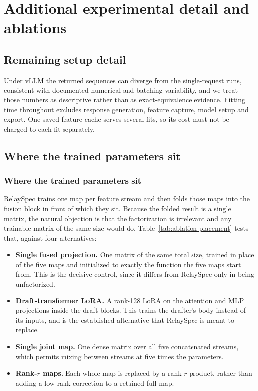 \section{Additional experimental detail and ablations}
\label{app:ablations}

\subsection{Remaining setup detail}
\label{app:setup-full}
Under vLLM the returned sequences can diverge from the single-request runs, consistent with documented numerical and batching variability, and we treat those numbers as descriptive rather than as exact-equivalence evidence. Fitting time throughout excludes response generation, feature capture, model setup and export. One saved feature cache serves several fits, so its cost must not be charged to each fit separately.

\subsection{Where the trained parameters sit}
\label{app:placement}

\subsubsection{Where the trained parameters sit}
\label{sec:ablation-placement}
RelaySpec trains one map per feature stream and then folds those maps into the fusion block in front of which they sit. Because the folded result is a single matrix, the natural objection is that the factorization is irrelevant and any trainable matrix of the same size would do. Table~\ref{tab:ablation-placement} tests that, against four alternatives:

\begin{itemize}\itemsep1pt\parskip0pt
\item \textbf{Single fused projection.} One matrix of the same total size, trained in place of the five maps and initialized to exactly the function the five maps start from. This is the decisive control, since it differs from RelaySpec only in being unfactorized.
\item \textbf{Draft-transformer LoRA.} A rank-128 LoRA on the attention and MLP projections inside the draft blocks. This trains the drafter's body instead of its inputs, and is the established alternative that RelaySpec is meant to replace.
\item \textbf{Single joint map.} One dense matrix over all five concatenated streams, which permits mixing between streams at five times the parameters.
\item \textbf{Rank-$r$ maps.} Each whole map is replaced by a rank-$r$ product, rather than adding a low-rank correction to a retained full map.
\end{itemize}

